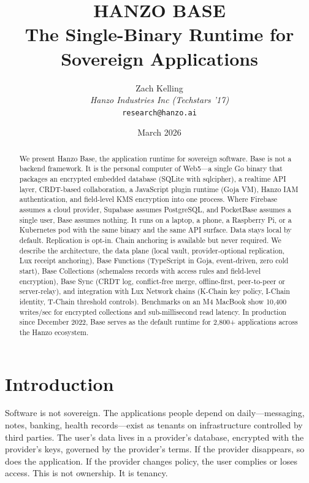 \documentclass[11pt]{article}
\title{HANZO BASE\\[0.3em]
{\large The Single-Binary Runtime for\\Sovereign Applications}}
\author{
    Zach Kelling \\
    \textit{Hanzo Industries Inc (Techstars '17)} \\
    \texttt{research@hanzo.ai}
}
\date{March 2026}
\begin{document}
\hanzocoverpage

\begin{abstract}
We present Hanzo Base, the application runtime for sovereign software. Base is
not a backend framework. It is the personal computer of Web5---a single Go
binary that packages an encrypted embedded database (SQLite with sqlcipher), a
realtime API layer, CRDT-based collaboration, a JavaScript plugin runtime
(Goja VM), Hanzo IAM authentication, and field-level KMS encryption into one
process. Where Firebase assumes a cloud provider, Supabase assumes PostgreSQL,
and PocketBase assumes a single user, Base assumes nothing. It runs on a
laptop, a phone, a Raspberry Pi, or a Kubernetes pod with the same binary and
the same API surface. Data stays local by default. Replication is opt-in.
Chain anchoring is available but never required. We describe the architecture,
the data plane (local vault, provider-optional replication, Lux receipt
anchoring), Base Functions (TypeScript in Goja, event-driven, zero cold start),
Base Collections (schemaless records with access rules and field-level
encryption), Base Sync (CRDT log, conflict-free merge, offline-first,
peer-to-peer or server-relay), and integration with Lux Network
chains (K-Chain key policy, I-Chain identity, T-Chain threshold controls).
Benchmarks on an M4 MacBook show 10,400 writes/sec for encrypted collections
and sub-millisecond read latency. In production since December 2022, Base
serves as the default runtime for 2,800+ applications across the Hanzo
ecosystem.
\end{abstract}

\section{Introduction}
\label{sec:intro}

Software is not sovereign. The applications people depend on daily---messaging,
notes, banking, health records---exist as tenants on infrastructure controlled
by third parties. The user's data lives in a provider's database, encrypted
with the provider's keys, governed by the provider's terms. If the provider
disappears, so does the application. If the provider changes policy, the user
complies or loses access. This is not ownership. It is tenancy.
\end{document}
